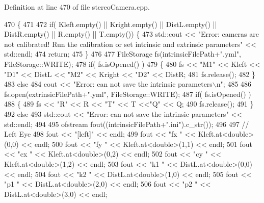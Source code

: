 Definition at line 470 of file stereo\+Camera.\+cpp.


\begin{DoxyCode}
470                                                                                      \{
471 
472     \textcolor{keywordflow}{if}( Kleft.empty() || Kright.empty() || DistL.empty() || DistR.empty() || R.empty() || T.empty()) \{
473         std::cout << \textcolor{stringliteral}{"Error: cameras are not calibrated! Run the calibration or set intrinsic and extrinsic
       parameters"} << std::endl;
474         \textcolor{keywordflow}{return};
475     \}
476 
477     FileStorage fs(intrinsicFilePath+\textcolor{stringliteral}{".yml"}, FileStorage::WRITE);
478     \textcolor{keywordflow}{if}( fs.isOpened() )
479     \{
480         fs << \textcolor{stringliteral}{"M1"} << Kleft << \textcolor{stringliteral}{"D1"} << DistL << \textcolor{stringliteral}{"M2"} << Kright << \textcolor{stringliteral}{"D2"} << DistR;
481         fs.release();
482     \}
483     \textcolor{keywordflow}{else}
484         cout << \textcolor{stringliteral}{"Error: can not save the intrinsic parameters\(\backslash\)n"};
485 
486     fs.open(extrinsicFilePath+\textcolor{stringliteral}{".yml"}, FileStorage::WRITE);
487     \textcolor{keywordflow}{if}( fs.isOpened() )
488     \{
489         fs << \textcolor{stringliteral}{"R"} << R << \textcolor{stringliteral}{"T"} << T <<\textcolor{stringliteral}{"Q"} << Q;
490         fs.release();
491     \}
492     \textcolor{keywordflow}{else}
493         std::cout << \textcolor{stringliteral}{"Error: can not save the intrinsic parameters"} << std::endl;
494 
495     ofstream fout((intrinsicFilePath+\textcolor{stringliteral}{".ini"}).c\_str());
496 
497     \textcolor{comment}{// Left Eye}
498     fout << \textcolor{stringliteral}{"[left]"} << endl;
499     fout << \textcolor{stringliteral}{"fx "} << Kleft.at<\textcolor{keywordtype}{double}>(0,0) << endl;
500     fout << \textcolor{stringliteral}{"fy "} << Kleft.at<\textcolor{keywordtype}{double}>(1,1) << endl;
501     fout << \textcolor{stringliteral}{"cx "} << Kleft.at<\textcolor{keywordtype}{double}>(0,2) << endl;
502     fout << \textcolor{stringliteral}{"cy "} << Kleft.at<\textcolor{keywordtype}{double}>(1,2) << endl;
503     fout << \textcolor{stringliteral}{"k1 "} << DistL.at<\textcolor{keywordtype}{double}>(0,0) << endl;
504     fout << \textcolor{stringliteral}{"k2 "} << DistL.at<\textcolor{keywordtype}{double}>(1,0) << endl;
505     fout << \textcolor{stringliteral}{"p1 "} << DistL.at<\textcolor{keywordtype}{double}>(2,0) << endl;
506     fout << \textcolor{stringliteral}{"p2 "} << DistL.at<\textcolor{keywordtype}{double}>(3,0) << endl;

\end{DoxyCode}

